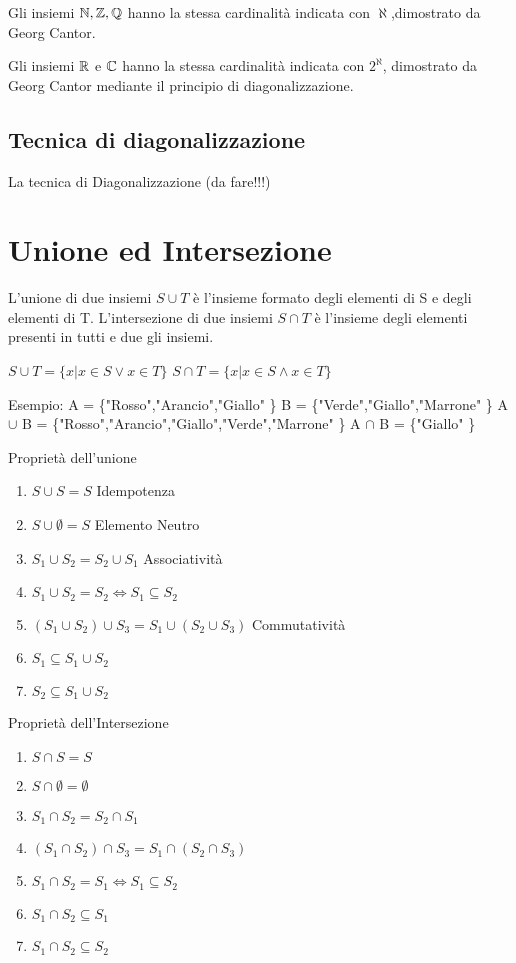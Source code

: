 Gli insiemi $\mathbb{N}, \mathbb{Z}, \mathbb{Q}$ hanno la stessa cardinalità indicata con $\aleph$,dimostrato da Georg Cantor.

Gli insiemi $\mathbb{R}$ e $\mathbb{C}$ hanno la stessa cardinalità indicata con $ 2 ^ \aleph$,
dimostrato da Georg Cantor mediante il principio di diagonalizzazione.

\subsection{Tecnica di diagonalizzazione}
La tecnica di Diagonalizzazione (da fare!!!)

\section{Unione ed Intersezione}
L'unione di due insiemi $S \cup T$ è l'insieme formato degli elementi di S e degli
elementi di T.\newline
L'intersezione di due insiemi $S \cap T$ è l'insieme degli elementi presenti in
tutti e due gli insiemi.

$S \cup T = \{x | x \in S \lor x \in T \} $ \newline
$S \cap T = \{x | x \in S \land x \in T \} $

Esempio:\newline
A = \{"Rosso","Arancio","Giallo" \} \newline
B = \{"Verde","Giallo","Marrone" \} \newline
A $\cup$ B = \{"Rosso","Arancio","Giallo","Verde","Marrone" \}
A $\cap$ B = \{"Giallo" \}

Proprietà dell'unione
\begin{enumerate}
\item $S \cup S = S$ \quad Idempotenza
\item $S \cup \emptyset = S$ \quad Elemento Neutro
\item $S_1 \cup S_2 = S_2 \cup S_1$ \quad Associatività
\item $S_1 \cup S_2 = S_2 \iff S_1 \subseteq S_2$
\item $(S_1 \cup S_2) \cup S_3 = S_1 \cup (S_2 \cup S_3)$ \quad Commutatività
\item $S_1 \subseteq S_1 \cup S_2$
\item $S_2 \subseteq S_1 \cup S_2$
\end{enumerate}

Proprietà dell'Intersezione
\begin{enumerate}
  \item $S \cap S = S$
  \item $S \cap \emptyset = \emptyset$
  \item $S_1 \cap S_2 = S_2 \cap S_1$
  \item $(S_1 \cap S_2) \cap S_3 = S_1 \cap (S_2 \cap S_3)$
  \item $S_1 \cap S_2 = S_1 \iff S_1 \subseteq S_2$
  \item $S_1 \cap S_2 \subseteq S_1$
  \item $S_1 \cap S_2 \subseteq S_2$
\end{enumerate}

